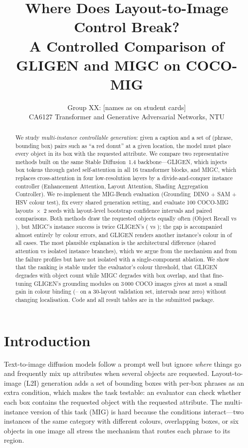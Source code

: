 \documentclass[10pt,twocolumn]{article}
\title{\vspace{-1.2em}\Large\textbf{Where Does Layout-to-Image Control Break?\\ A Controlled Comparison of GLIGEN and MIGC on COCO-MIG}\vspace{-0.3em}}
\author{Group XX: [names as on student cards] \\ CA6127 Transformer and Generative Adversarial Networks, NTU}
\date{\vspace{-1.5em}}
\begin{document}
\maketitle

\begin{abstract}
We study \emph{multi-instance controllable generation}: given a caption and a set of (phrase, bounding box) pairs such as ``a red donut'' at a given location, the model must place every object in its box with the requested attribute. We compare two representative methods built on the same Stable Diffusion~1.4 backbone---GLIGEN, which injects box tokens through gated self-attention in all 16 transformer blocks, and MIGC, which replaces cross-attention in four low-resolution layers by a divide-and-conquer instance controller (Enhancement Attention, Layout Attention, Shading Aggregation Controller). We re-implement the MIG-Bench evaluation (Grounding~DINO + SAM + HSV colour test), fix every shared generation setting, and evaluate 100 COCO-MIG layouts~$\times$~2 seeds with layout-level bootstrap confidence intervals and paired comparisons. Both methods draw the requested objects equally often (Object Recall \RecallG{} vs \RecallM), but MIGC's instance success is twice GLIGEN's (\AttrM{} vs \AttrG); the gap is accompanied almost entirely by colour errors, and GLIGEN renders another instance's colour in \LeakG{} of all cases. The most plausible explanation is the architectural difference (shared attention vs isolated instance branches), which we argue from the mechanism and from the failure profiles but have not isolated with a single-component ablation. We show that the ranking is stable under the evaluator's colour threshold, that GLIGEN degrades with object count while MIGC degrades with box overlap, and that fine-tuning GLIGEN's grounding modules on 3\,000 COCO images gives at most a small gain in colour binding (\FtMinGain--\FtMaxGain{} on a 30-layout validation set, intervals near zero) without changing localisation. Code and all result tables are in the submitted package.
\end{abstract}

\section{Introduction}
Text-to-image diffusion models follow a prompt well but ignore \emph{where} things go and frequently mix up attributes when several objects are requested. Layout-to-image (L2I) generation adds a set of bounding boxes with per-box phrases as an extra condition, which makes the task testable: an evaluator can check whether each box contains the requested object with the requested attribute. The multi-instance version of this task (MIG) is hard because the conditions interact---two instances of the same category with different colours, overlapping boxes, or six objects in one image all stress the mechanism that routes each phrase to its region.
\end{document}
